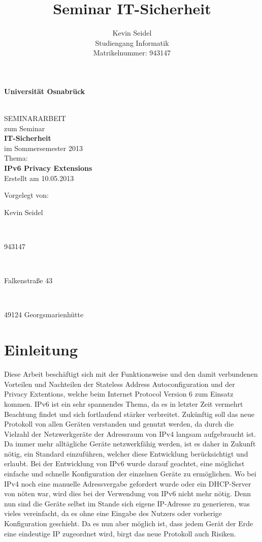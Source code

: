 \documentclass[a4paper, 12pt]{scrartcl}
\title{Seminar IT-Sicherheit}
\author{Kevin Seidel \\ Studiengang Informatik \\ Matrikelnummer: 943147}
\begin{document}
\begin{titlepage}
\begin{center}
\vspace*{1.5cm}
\begin{Large}
\textbf{Universität Osnabrück}
\end{Large}

\noindent\hrulefill
\\[3.5cm]
SEMINARARBEIT \\[1cm]
zum Seminar \\[1cm]
\textbf{IT-Sicherheit} \\[1.5cm]
im Sommersemester 2013 \\[1.5cm]
Thema: \\[0.5cm]
\textbf{IPv6 Privacy Extensions} \\[2cm]
Erstellt am 10.05.2013
\end{center}
\vfill
\begin{flushleft}
Vorgelegt von: 
\hfill \parbox{46mm}{Kevin Seidel} \\
\hfill \parbox{46mm}{943147} \\
\hfill \parbox{46mm}{Falkenstraße 43} \\
\hfill \parbox{46mm}{49124 Georgsmarienhütte}
\end{flushleft}
\end{titlepage}

\newpage

\setcounter{page}{2}
\tableofcontents

\newpage
{}
\setcounter{page}{1}

\section{Einleitung}




Diese Arbeit beschäftigt sich mit der Funktionsweise und den damit verbundenen Vorteilen und Nachteilen der Stateless Address Autoconfiguration und der Privacy Extentions, welche beim Internet Protocol Version 6 zum Einsatz kommen.
IPv6 ist ein sehr spannendes Thema, da es in letzter Zeit vermehrt Beachtung findet und sich fortlaufend stärker verbreitet. 
Zukünftig soll das neue Protokoll von allen Geräten verstanden und genutzt werden, da durch die Vielzahl der Netzwerkgeräte der Adressraum von IPv4 langsam aufgebraucht ist.
Da immer mehr alltägliche Geräte netzwerkfähig werden, ist es daher in Zukunft nötig, ein Standard einzuführen, welcher diese Entwicklung berücksichtigt und erlaubt.
Bei der Entwicklung von IPv6 wurde darauf geachtet, eine möglichst einfache und schnelle Konfiguration der einzelnen Geräte zu ermöglichen.
Wo bei IPv4 noch eine manuelle Adressvergabe gefordert wurde oder ein DHCP-Server von nöten war, wird dies bei der Verwendung von IPv6 nicht mehr nötig.
Denn nun sind die Geräte selbst im Stande sich eigene IP-Adresse zu generieren, was vieles vereinfacht, da es ohne eine Eingabe des Nutzers oder vorherige Konfiguration geschieht.
Da es nun aber möglich ist, dass jedem Gerät der Erde eine eindeutige IP zugeordnet wird, birgt das neue Protokoll auch Risiken.
\end{document}
